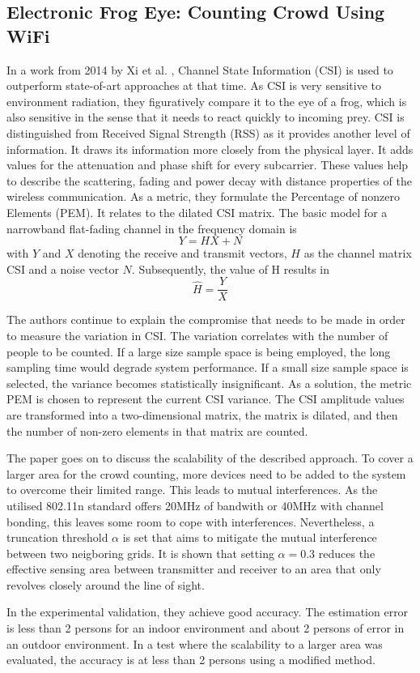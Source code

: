 \documentclass[conference]{IEEEtran}
\begin{document}
\subsection{Electronic Frog Eye: Counting Crowd Using WiFi}
In a work from 2014 by Xi et al. \cite{Xi}, Channel State Information (CSI) is used to outperform state-of-art approaches at that time. As CSI is very sensitive to environment radiation, they figuratively compare it to the eye of a frog, which is also sensitive in the sense that it needs to react quickly to incoming prey. CSI is distinguished from Received Signal Strength (RSS) as it provides another level of information. It draws its information more closely from the physical layer. It adds values for the attenuation and phase shift for every subcarrier. These values help to describe the scattering, fading and power decay with distance properties of the wireless communication. As a metric, they formulate the Percentage of nonzero Elements (PEM). It relates to the dilated CSI matrix. The basic model for a narrowband flat-fading channel in the frequency domain is
$$ Y = HX + N $$
with $Y$ and $X$ denoting the receive and transmit vectors, $H$ as the channel matrix CSI and a noise vector $N$. Subsequently, the value of H results in 
$$ \widehat{H} = \frac{Y}{X} $$
\par
The authors continue to explain the compromise that needs to be made in order to measure the variation in CSI. The variation correlates with the number of people to be counted. If a large size sample space is being employed, the long sampling time would degrade system performance. If a small size sample space is selected, the variance becomes statistically insignificant. As a solution, the metric PEM is chosen to represent the current CSI variance. The CSI amplitude values are transformed into a two-dimensional matrix, the matrix is dilated, and then the number of non-zero elements in that matrix are counted.
\par
The paper goes on to discuss the scalability of the described approach. To cover a larger area for the crowd counting, more devices need to be added to the system to overcome their limited range. This leads to mutual interferences. As the utilised 802.11n standard offers 20MHz of bandwith or 40MHz with channel bonding, this leaves some room to cope with interferences. Nevertheless, a truncation threshold $\alpha$ is set that aims to mitigate the mutual interference between two neigboring grids. It is shown that setting $\alpha = 0.3$ reduces the effective sensing area between transmitter and receiver to an area that only revolves closely around the line of sight.
\par
In the experimental validation, they achieve good accuracy. The estimation error is less than 2 persons for an indoor environment and about 2 persons of error in an outdoor environment. In a test where the scalability to a larger area was evaluated, the accuracy is at less than 2 persons using a modified method.
\end{document}
